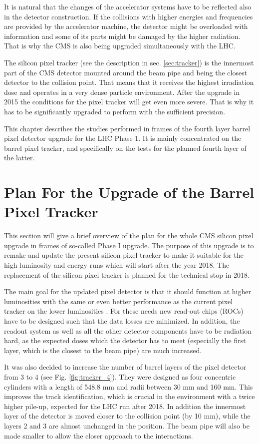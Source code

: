 It is natural that the changes of the accelerator systems have to be reflected also in the detector construction.
If the collisions with higher energies and frequencies are provided by the accelerator machine, the detector might
be overloaded with information and some of its parts might be damaged by the higher radiation. That is why 
the CMS is also being upgraded simultaneously with the LHC.

The silicon pixel tracker (see the description in sec. \ref{sec:tracker}) is the innermost part of the CMS 
detector mounted around the beam pipe and being the closest detector to the collision point. That means that
it receives the highest irradiation dose and operates in a very dense particle environment. After the upgrade 
in 2015 the conditions for the pixel tracker will get even more severe. That is why it has to be significantly 
upgraded to perform with the sufficient precision. 

This chapter describes the studies performed in frames of the fourth layer barrel pixel detector upgrade for the
LHC Phase 1. It is mainly concentrated on the barrel pixel tracker, and specifically on the tests for the
planned fourth layer of the latter.

\section{Plan For the Upgrade of the Barrel Pixel Tracker}

This section will give a brief overview of the plan for the whole CMS silicon pixel upgrade in frames of so-called
Phase I upgrade. The purpose of this upgrade is to remake and update the present silicon pixel tracker to make it 
suitable for the high luminosity and energy runs which will start after the year 2018. The replacement of the silicon
pixel tracker is planned for the technical stop in 2018. 

The main goal for the updated pixel detector is that it should function at higher luminosities with the same or even
better performance as the current pixel tracker on the lower luminosities \cite{CMS:2012sda}. For these needs new read-out chips
(ROCs) have to be designed such that the data losses are minimized. In addition, the readout system as well as all
the other detector components have to be radiation hard, as the expected doses which the detector has to meet (especially
the first layer, which is the closest to the beam pipe) are much increased.

It was also decided to increase the number of barrel layers of the pixel detector from 3 to 4 (see Fig. \ref{fig:tracker_4}).
They were designed as four concentric cylinders with a length of 548.8 mm and radii between 30 mm and 160 mm.
This improves the track identification, which is crucial in the environment with a twice higher pile-up, expected for the 
LHC run after 2018. In addition the innermost layer of the detector is moved closer to the collision point (by 10 mm), while
the layers 2 and 3 are almost unchanged in the position. The beam pipe
will also be made smaller to allow the closer approach to the interactions.

